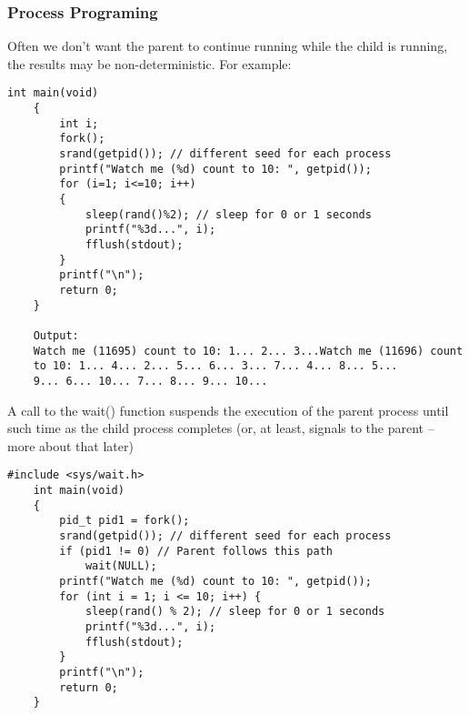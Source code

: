 \documentclass[a4paper, 10pt]{article}
\begin{document}
\subsubsection*{Process Programing}
Often we don't want the parent to continue running while the child is running, the results may be non-deterministic. For example:
\begin{lstlisting}[style=cStyle, caption={Unpredictable a process}]
    int main(void)
    {
        int i;
        fork();
        srand(getpid()); // different seed for each process
        printf("Watch me (%d) count to 10: ", getpid());
        for (i=1; i<=10; i++)
        {
            sleep(rand()%2); // sleep for 0 or 1 seconds
            printf("%3d...", i);
            fflush(stdout);
        }
        printf("\n");
        return 0;
    }

    Output:
    Watch me (11695) count to 10: 1... 2... 3...Watch me (11696) count
    to 10: 1... 4... 2... 5... 6... 3... 7... 4... 8... 5...
    9... 6... 10... 7... 8... 9... 10...
\end{lstlisting}
A call to the wait() function suspends the execution of the parent
process until such time as the child process completes (or, at least,
signals to the parent – more about that later)
\begin{lstlisting}[style=cStyle, caption={Wait for a process}]
    #include <sys/wait.h>
    int main(void)
    {
        pid_t pid1 = fork();
        srand(getpid()); // different seed for each process
        if (pid1 != 0) // Parent follows this path
            wait(NULL);
        printf("Watch me (%d) count to 10: ", getpid());
        for (int i = 1; i <= 10; i++) {
            sleep(rand() % 2); // sleep for 0 or 1 seconds
            printf("%3d...", i);
            fflush(stdout);
        }
        printf("\n");
        return 0;
    }
\end{lstlisting}





\end{document}
